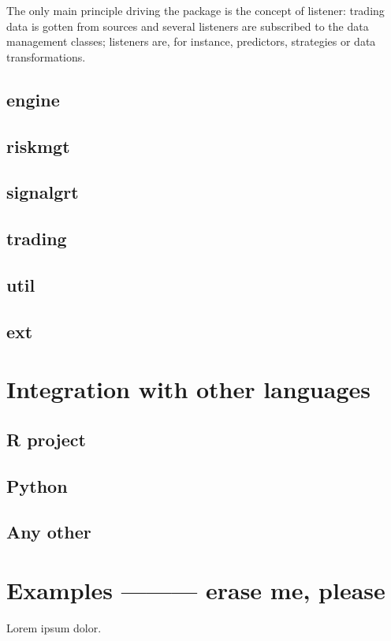 \documentclass[11pt,a4paper]{article}
\begin{document}
The only main principle driving the package is the concept of listener:
trading data is gotten from sources and several listeners are subscribed to
the data management classes; listeners are, for instance, predictors,
strategies or data transformations.

\subsection{engine}

\subsection{riskmgt}

\subsection{signalgrt}

\subsection{trading}

\subsection{util}

\subsection{ext}

\section{Integration with other languages}

\subsection{R project}

\subsection{Python}

\subsection{Any other}

\section{Examples --------- erase me, please}
Lorem ipsum dolor.
\end{document}
